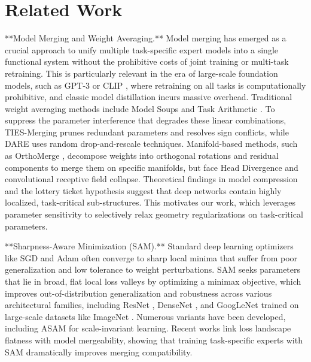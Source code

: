 \documentclass{article}
\theoremstyle{plain}
\theoremstyle{definition}
\theoremstyle{remark}
\begin{document}
\section{Related Work}
\label{submission-related-work}
**Model Merging and Weight Averaging.** Model merging has emerged as a crucial approach to unify multiple task-specific expert models into a single functional system without the prohibitive costs of joint training or multi-task retraining. This is particularly relevant in the era of large-scale foundation models, such as GPT-3 \cite{brown2020language} or CLIP \cite{radford2021learning}, where retraining on all tasks is computationally prohibitive, and classic model distillation \cite{hinton2015distilling} incurs massive overhead. Traditional weight averaging methods include Model Soups \cite{wortsman2022model} and Task Arithmetic \cite{ilharco2022editing}. To suppress the parameter interference that degrades these linear combinations, TIES-Merging \cite{yadav2023ties} prunes redundant parameters and resolves sign conflicts, while DARE \cite{yu2024dare} uses random drop-and-rescale techniques. Manifold-based methods, such as OrthoMerge \cite{yang2026orthogonal}, decompose weights into orthogonal rotations and residual components to merge them on specific manifolds, but face Head Divergence and convolutional receptive field collapse. Theoretical findings in model compression \cite{hoefler2021sparsity} and the lottery ticket hypothesis \cite{frankle2018lottery} suggest that deep networks contain highly localized, task-critical sub-structures. This motivates our work, which leverages parameter sensitivity to selectively relax geometry regularizations on task-critical parameters.

**Sharpness-Aware Minimization (SAM).** Standard deep learning optimizers like SGD and Adam \cite{kingma2014adam} often converge to sharp local minima that suffer from poor generalization and low tolerance to weight perturbations. SAM \cite{foret2020sharpness} seeks parameters that lie in broad, flat local loss valleys by optimizing a minimax objective, which improves out-of-distribution generalization and robustness across various architectural families, including ResNet \cite{he2016deep}, DenseNet \cite{huang2017densely}, and GoogLeNet \cite{szegedy2015going} trained on large-scale datasets like ImageNet \cite{russakovsky2015imagenet, deng2009imagenet}. Numerous variants have been developed, including ASAM \cite{kwon2021asam} for scale-invariant learning. Recent works link loss landscape flatness with model mergeability, showing that training task-specific experts with SAM dramatically improves merging compatibility.
\end{document}
